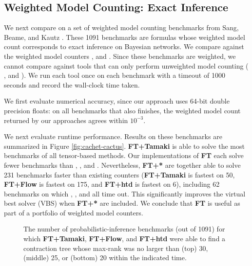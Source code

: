 \subsection{Weighted Model Counting: Exact Inference}
\label{sec:tensors:experiments:cachet}
We next compare on a set of weighted model counting benchmarks from Sang, Beame, and Kautz . These 1091 benchmarks are formulas whose weighted model count corresponds to exact inference on Bayesian networks. We compare against the weighted model counters  \cite{SBK05},  \cite{OD15} and  \cite{LM17}. Since these benchmarks are weighted, we cannot compare against tools that can only perform unweighted model counting ( \cite{CW16},  \cite{FHMW17} and  \cite{Thurley2006}). We run each tool once on each benchmark with a timeout of 1000 seconds and record the wall-clock time taken.

We first evaluate numerical accuracy, since our approach uses 64-bit double precision floats: on all benchmarks that  also finishes, the weighted model count returned by our approaches agrees within $10^{-3}$.

We next evaluate runtime performance. Results on these benchmarks are summarized in Figure \ref{fig:cachet-cactus}. \textbf{FT+Tamaki} is able to solve the most benchmarks of all tensor-based methods. Our implementations of \textbf{FT} each solve fewer benchmarks than , , and . Nevertheless, \textbf{FT+*} are together able to solve 231 benchmarks faster than existing counters (\textbf{FT+Tamaki} is fastest on 50, \textbf{FT+Flow} is fastest on 175, and \textbf{FT+htd} is fastest on 6), including 62 benchmarks on which , , and  all time out. This significantly improves the virtual best solver (VBS) when \textbf{FT+*} are included. We conclude that \textbf{FT} is useful as part of a portfolio of weighted model counters.


\begin{figure}
	\centering
	
	\caption{\label{fig:solver-analysis} The number of probabilistic-inference benchmarks (out of 1091) for which \textbf{FT+Tamaki}, \textbf{FT+Flow}, and \textbf{FT+htd} were able to find a contraction tree whose max-rank was no larger than (top) 30, (middle) 25, or (bottom) 20 within the indicated time.}
\end{figure}

